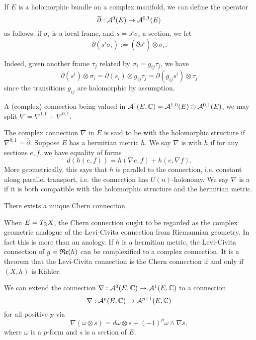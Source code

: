 If $E$ is a holomorphic bundle on a complex manifold, we can define the operator
%
\[
\overline\partial:\mathcal{A}^0(E)\to \mathcal{A}^{0,1}(E)
\]
%
as follows: if $\sigma_i$ is a local frame, and $s=s^i \sigma_i$ a section, we let
\begin{equation}
	\overline\partial(s^i\sigma_i):=(\overline\partial s^i)\otimes \sigma_i.\label{eq: dbar bundle}
\end{equation}

Indeed, given another frame $\tau_j$ related by $\sigma_i=g_{ij}\tau_j$, we have
\[
\overline\partial (s^i)\otimes \sigma_i=\overline \partial(s_i)\otimes g_{ij}\tau_j=\overline\partial(g_{ij}s^i)\otimes \tau_j
\]
since the transitions $g_{ij}$ are holomorphic by assumption.

A (complex) connection being valued in $\mathcal{A}^1(E,\mathbb C)=\mathcal{A}^{1,0}(E)\oplus\mathcal{A}^{0,1}(E)$, we may split $\nabla=\nabla^{1,0}+\nabla^{0,1}$.
\begin{definition}
	The complex connection $\nabla$ in $E$ is said to be  with the holomorphic structure if $\nabla^{0,1}=\overline\partial$. Suppose $E$ has a hermitian metric $h$. We say $\nabla$ is  with $h$ if for any sections $e,f$, we have equality of forms
	\[d(h(e,f))=h(\nabla e,f)+h(e,\nabla f).\]
	More geometrically, this says that $h$ is parallel to the connection, i.e. constant along parallel transport, i.e. the connection has $U(n)$-holonomy. We say $\nabla$ is a  if it is both compatible with the holomorphic structure and the hermitian metric.
\end{definition} 

\begin{theorem}[Chern]
	There exists a unique Chern connection.
\end{theorem}

When $E=T_\mathbb R X$, the Chern connection ought to be regarded as the complex geometric analogue of the Levi-Civita connection from Riemannian geometry. In fact this is more than an analogy. If $h$ is a hermitian metric, the Levi-Civita connection of $g=\mathfrak{R}\mathfrak{e}(h)$ can be complexified to a complex connection. It is a theorem that the Levi-Civita connection is the Chern connection if and only if $(X,h)$ is Kähler.

We can extend the connection $\nabla:\mathcal{A}^0(E,\mathbb C)\to \mathcal{A}^1(E,\mathbb C)$ to a connection
\[
\nabla:\mathcal{A}^p(E,\mathbb C)\to \mathcal{A}^{p+1}(E,\mathbb C)
\]
for all positive $p$ via
\[
\nabla(\omega\otimes s)=d\omega\otimes s+(-1)^p\omega\wedge\nabla s,
\]
where $\omega$ is a $p$-form and $s$ is a section of $E$.

